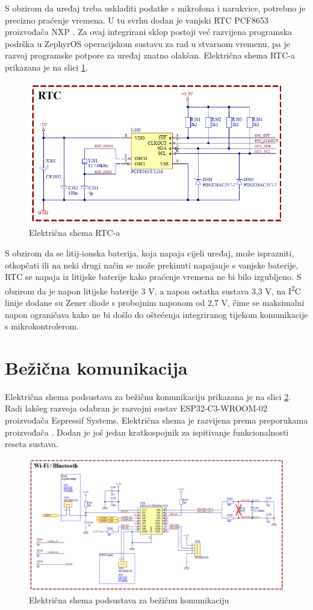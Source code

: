 S obzirom da uređaj treba uskladiti podatke s mikrofona i narukvice, potrebno je precizno praćenje vremena. U tu svrhu dodan je vanjski RTC PCF8653 proizvođača NXP \cite{nxp:pcf8654}. Za ovaj integrirani sklop postoji već razvijena programska podrška u ZephyrOS operacijskom sustavu za rad u stvarnom vremenu, pa je razvoj programske potpore za uređaj znatno olakšan. Električna shema RTC-a prikazana je na slici \ref{slk:RTC}.
\begin{figure}[hbt]
    \centering
    \includegraphics[width=10 cm]{Figures/RTC.png}
    \caption{Električna shema RTC-a}
    \label{slk:RTC}
\end{figure}
S obzirom da se litij-ionska baterija, koja napaja cijeli uređaj, može isprazniti, otkopčati ili na neki drugi način se može prekinuti napajanje s vanjske baterije, RTC se napaja iz litijske baterije kako praćenje vremena ne bi bilo izgubljeno. S obzirom da je napon litijske baterije 3 V, a napon ostatka sustava 3,3 V, na I\textsuperscript{2}C linije dodane su Zener diode s probojnim naponom od 2,7 V, čime se maksimalni napon ograničava kako ne bi došlo do oštećenja integriranog tijekom komunikacije s mikrokontrolerom.

\section{Bežična komunikacija}
Električna shema podsustava za bežičnu komunikaciju prikazana je na slici \ref{slk:WIFI}. Radi lakšeg razvoja odabran je razvojni sustav ESP32-C3-WROOM-02 proizvođača Espressif Systems. Električna shema je razvijena prema preporukama proizvođača \cite{espressif:wroom02}. Dodan je još jedan kratkospojnik za ispitivanje funkcionalnosti reseta sustava.
\begin{figure}[!hbt]
    \centering
    \includegraphics[width=\textwidth]{Figures/WIRELESS.png}
    \caption{Električna shema podsustava za bežičnu komunikaciju}
    \label{slk:WIFI}
\end{figure}

